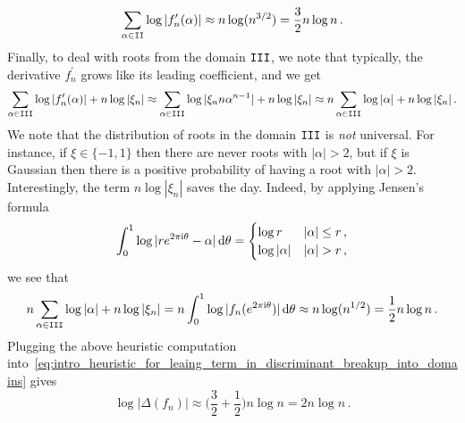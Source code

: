 \documentclass[11pt]{amsart}
\theoremstyle{remark}
\theoremstyle{definition}
\newcommand{\I}{{\rm i}}
\begin{document}
        \[
        \sum_{\alpha \in {\tt II} } \log|f_n^\prime(\alpha)| \approx n\log(n^{3/2}) = \frac{3}{2} n \log n \, . 
        \]
        Finally, to deal with roots from the domain ${\tt III}$, we note that typically, the derivative $f_n^\prime$ grows like its leading coefficient, and we get 
        \[
        \sum_{\alpha\in {\tt III}} \log|f_n^\prime(\alpha)| + n \log|\xi_n| \approx \sum_{\alpha\in {\tt III}} \log|\xi_n n \alpha^{n-1}| + n \log|\xi_n| \approx n\sum_{\alpha\in {\tt III}} \log|\alpha| + n\log|\xi_n| \, . 
        \]
         We note that the distribution of roots in the domain ${\tt III}$ is \emph{not} universal. For instance, if $\xi \in \{-1,1\}$ then there are never roots with $|\alpha| > 2$, but if $\xi$ is Gaussian then there is a positive probability of having a root with $|\alpha| > 2$. Interestingly, the term $n\log|\xi_n|$ saves the day.
        Indeed, by applying
        Jensen's formula~\cite[p.207]{Ahlfors}
        \begin{equation}
            \label{eq:intro-Jensen_formula}
            \int_{0}^{1} \log|re^{2\pi \I \theta} - \alpha| \,  {\rm d} \theta = \begin{cases}
                \log r & |\alpha|\le r \, , \\ \log|\alpha| & |\alpha| > r \, ,
            \end{cases}
        \end{equation}
        we see that
        \[
        n\sum_{\alpha\in {\tt III}} \log|\alpha| + n\log|\xi_n| = n\int_{0}^{1}\log|f_n(e^{2\pi \I \theta})| \, {\rm d}\theta \approx n \log(n^{1/2}) = \frac{1}{2} n \log n \, .
        \]
        Plugging the above heuristic computation into~\eqref{eq:intro_heuristic_for_leaing_term_in_discriminant_breakup_into_domains} gives
        \[
        \log|\Delta(f_n)| \approx \Big(\frac{3}{2} + \frac{1}{2}\Big) n \log n = 2n\log n \, .
        \]
        
\end{document}
